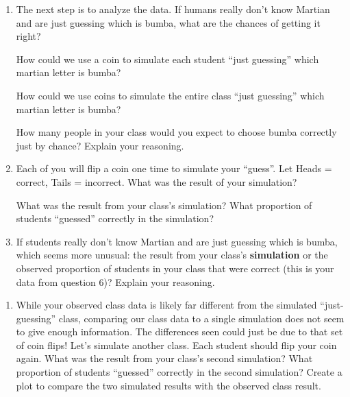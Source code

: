 \documentclass[
]{article}
\providecommand{\tightlist}{%
  \setlength{\itemsep}{0pt}\setlength{\parskip}{0pt}}
\begin{document}
\begin{enumerate}
\def\labelenumi{\arabic{enumi}.}
\setcounter{enumi}{8}
\item
  The next step is to analyze the data. If humans really don't know
  Martian and are just guessing which is bumba, what are the chances of
  getting it right? \vspace{0.5in}

  How could we use a coin to simulate each student ``just guessing''
  which martian letter is bumba? \vspace{1in}

  How could we use coins to simulate the entire class ``just guessing''
  which martian letter is bumba? \vspace{1in}

  How many people in your class would you expect to choose bumba
  correctly just by chance? Explain your reasoning. \vspace{1in}
\item
  Each of you will flip a coin one time to simulate your ``guess''. Let
  Heads = correct, Tails = incorrect. What was the result of your
  simulation? \vspace{0.5in}

  What was the result from your class's simulation? What proportion of
  students ``guessed'' correctly in the simulation? \vspace{0.5in}
\item
  If students really don't know Martian and are just guessing which is
  bumba, which seems more unusual: the result from your class's
  \textbf{simulation} or the observed proportion of students in your
  class that were correct (this is your data from question 6)? Explain
  your reasoning.
\end{enumerate}

\vspace{1in}

\begin{enumerate}
\def\labelenumi{\arabic{enumi}.}
\setcounter{enumi}{11}
\tightlist
\item
  While your observed class data is likely far different from the
  simulated ``just-guessing'' class, comparing our class data to a
  single simulation does not seem to give enough information. The
  differences seen could just be due to that set of coin flips! Let's
  simulate another class. Each student should flip your coin again. What
  was the result from your class's second simulation? What proportion of
  students ``guessed'' correctly in the second simulation? Create a plot
  to compare the two simulated results with the observed class result.
\end{enumerate}
\end{document}
